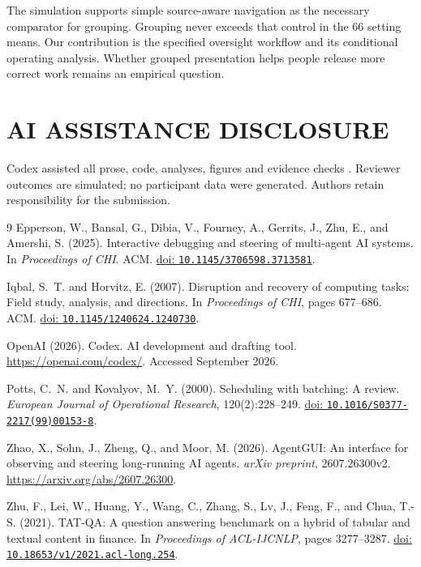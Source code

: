 \documentclass[a4paper,twoside]{article}
\newcommand{\doi}[1]{\href{https://doi.org/#1}{doi: \nolinkurl{#1}}}
\begin{document}
The simulation supports simple source-aware navigation as the necessary comparator for grouping. Grouping never exceeds that control in the 66 setting means. Our contribution is the specified oversight workflow and its conditional operating analysis. Whether grouped presentation helps people release more correct work remains an empirical question.

\section*{AI ASSISTANCE DISCLOSURE}
Codex assisted all prose, code, analyses, figures and evidence checks \cite{codex}. Reviewer outcomes are simulated; no participant data were generated. Authors retain responsibility for the submission.

{\small
\begin{thebibliography}{9}
Epperson, W., Bansal, G., Dibia, V., Fourney, A., Gerrits, J., Zhu, E., and Amershi, S. (2025).
Interactive debugging and steering of multi-agent AI systems.
In \emph{Proceedings of CHI}. ACM.
\doi{10.1145/3706598.3713581}.

Iqbal, S.~T. and Horvitz, E. (2007).
Disruption and recovery of computing tasks: Field study, analysis, and directions.
In \emph{Proceedings of CHI}, pages 677--686. ACM.
\doi{10.1145/1240624.1240730}.

OpenAI (2026). Codex. AI development and drafting tool.
\url{https://openai.com/codex/}. Accessed September 2026.

Potts, C.~N. and Kovalyov, M.~Y. (2000).
Scheduling with batching: A review.
\emph{European Journal of Operational Research}, 120(2):228--249.
\doi{10.1016/S0377-2217(99)00153-8}.

Zhao, X., Sohn, J., Zheng, Q., and Moor, M. (2026).
AgentGUI: An interface for observing and steering long-running AI agents.
\emph{arXiv preprint}, 2607.26300v2.
\url{https://arxiv.org/abs/2607.26300}.

Zhu, F., Lei, W., Huang, Y., Wang, C., Zhang, S., Lv, J., Feng, F., and Chua, T.-S. (2021).
TAT-QA: A question answering benchmark on a hybrid of tabular and textual content in finance.
In \emph{Proceedings of ACL-IJCNLP}, pages 3277--3287.
\doi{10.18653/v1/2021.acl-long.254}.
\end{thebibliography}
}
\end{document}

